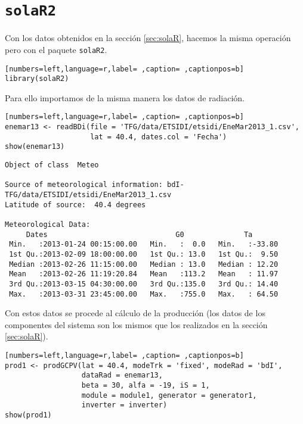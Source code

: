 \section{\texttt{solaR2}}
\label{sec:org9ad576d}
\label{sec:solaR2}
Con los datos obtenidos en la sección \ref{sec:solaR}, hacemos la misma operación pero con el paquete \texttt{solaR2}.
\begin{lstlisting}[numbers=left,language=r,label= ,caption= ,captionpos=b]
library(solaR2)
\end{lstlisting}

Para ello importamos de la misma manera los datos de radiación.
\begin{lstlisting}[numbers=left,language=r,label= ,caption= ,captionpos=b]
enemar13 <- readBDi(file = 'TFG/data/ETSIDI/etsidi/EneMar2013_1.csv',
                    lat = 40.4, dates.col = 'Fecha')
show(enemar13)
\end{lstlisting}

\begin{verbatim}
Object of class  Meteo 

Source of meteorological information: bdI-TFG/data/ETSIDI/etsidi/EneMar2013_1.csv 
Latitude of source:  40.4 degrees

Meteorological Data:
     Dates                              G0              Ta        
 Min.   :2013-01-24 00:15:00.00   Min.   :  0.0   Min.   :-33.80  
 1st Qu.:2013-02-09 18:00:00.00   1st Qu.: 13.0   1st Qu.:  9.50  
 Median :2013-02-26 11:15:00.00   Median : 13.0   Median : 12.20  
 Mean   :2013-02-26 11:19:20.84   Mean   :113.2   Mean   : 11.97  
 3rd Qu.:2013-03-15 04:30:00.00   3rd Qu.:135.0   3rd Qu.: 14.40  
 Max.   :2013-03-31 23:45:00.00   Max.   :755.0   Max.   : 64.50
\end{verbatim}

Con estos datos se procede al cálculo de la producción (los datos de los componentes del sistema son los mismos que los realizados en la sección \ref{sec:solaR}).
\begin{lstlisting}[numbers=left,language=r,label= ,caption= ,captionpos=b]
prod1 <- prodGCPV(lat = 40.4, modeTrk = 'fixed', modeRad = 'bdI',
                  dataRad = enemar13,
                  beta = 30, alfa = -19, iS = 1,
                  module = module1, generator = generator1,
                  inverter = inverter)
show(prod1)
\end{lstlisting}

